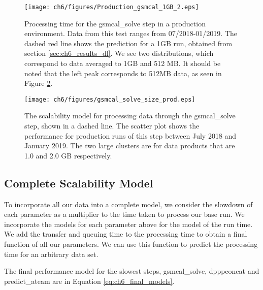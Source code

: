 \begin{figure}
    \texttt{[image: ch6/figures/Production\_gsmcal\_1GB\_2.eps]}
      \caption{Processing time for the {\selectfont gsmcal\_solve} step in a production environment. Data from this test ranges from 07/2018-01/2019. The dashed red line shows the prediction for a 1GB run, obtained from section \ref{sec:ch6_results_dl}. We see two distributions, which correspond to data averaged to 1GB and 512 MB.  It should be noted that the left peak corresponds to 512MB data, as seen in Figure \ref{fig:ch6_prod_gsmcal_times}.}
	\label{fig:ch6_prod_gsmcal}
\end{figure}


\begin{figure}
    \texttt{[image: ch6/figures/gsmcal\_solve\_size\_prod.eps]}
      \caption{The scalability model for processing data through the {\selectfont gsmcal\_solve} step, shown in a dashed line. The scatter plot shows the performance for production runs of this step between July 2018 and January 2019. The two large clusters are for data products that are 1.0 and 2.0 GB respectively. }
	\label{fig:ch6_prod_gsmcal_times}
\end{figure}


\subsection{Complete Scalability Model}
To incorporate all our data into a complete model, we consider the slowdown of each parameter as a multiplier to the time taken to process our base run. We incorporate the models for each parameter above for the model of the run time. We add the transfer and queuing time to the processing time to obtain a final function of all our parameters. We can use this function to predict the processing time for an arbitrary data set. 

The final performance model for the slowest steps, {\selectfont gsmcal\_solve}, {\selectfont dpppconcat}  and {\selectfont predict\_ateam} are in Equation \ref{eq:ch6_final_models}. 

